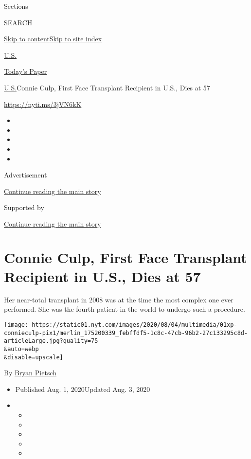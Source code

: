 Sections

SEARCH

\protect\hyperlink{site-content}{Skip to
content}\protect\hyperlink{site-index}{Skip to site index}

\href{https://www.nytimes.com/section/us}{U.S.}

\href{https://myaccount.nytimes.com/auth/login?response_type=cookie\&client_id=vi}{}

\href{https://www.nytimes.com/section/todayspaper}{Today's Paper}

\href{/section/us}{U.S.}\textbar{}Connie Culp, First Face Transplant
Recipient in U.S., Dies at 57

\url{https://nyti.ms/3jVN6kK}

\begin{itemize}
\item
\item
\item
\item
\item
\end{itemize}

Advertisement

\protect\hyperlink{after-top}{Continue reading the main story}

Supported by

\protect\hyperlink{after-sponsor}{Continue reading the main story}

\hypertarget{connie-culp-first-face-transplant-recipient-in-us-dies-at-57}{%
\section{Connie Culp, First Face Transplant Recipient in U.S., Dies at
57}\label{connie-culp-first-face-transplant-recipient-in-us-dies-at-57}}

Her near-total transplant in 2008 was at the time the most complex one
ever performed. She was the fourth patient in the world to undergo such
a procedure.

\texttt{[image: https://static01.nyt.com/images/2020/08/04/multimedia/01xp-connieculp-pix1/merlin\_175200339\_febffdf5-1c8c-47cb-96b2-27c133295c8d-articleLarge.jpg?quality=75\\\&auto=webp\\\&disable=upscale]}

By \href{https://www.nytimes.com/by/bryan-pietsch}{Bryan Pietsch}

\begin{itemize}
\item
  Published Aug. 1, 2020Updated Aug. 3, 2020
\item
  \begin{itemize}
  \item
  \item
  \item
  \item
  \item
  \end{itemize}
\end{itemize}

